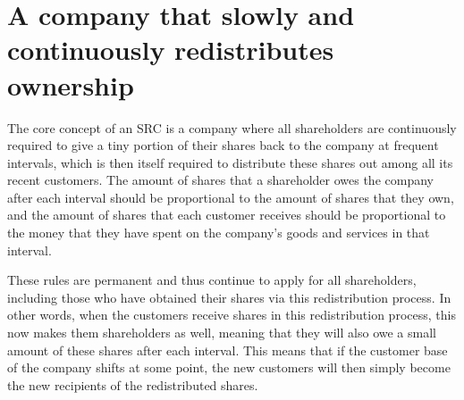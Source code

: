 \documentclass{article}
\begin{document}
\section{A company that slowly and continuously redistributes ownership}
\label{sect_def}



The core concept of an SRC is a company where all shareholders are continuously required to give a tiny portion of their shares back to the company at frequent intervals, which is then itself required to distribute these shares out among all its recent customers. The amount of shares that a shareholder owes the company after each interval should be proportional to the amount of shares that they own, and the amount of shares that each customer receives should be proportional to the money that they have spent on the company's goods and services in that interval. 

These rules are permanent and thus continue to apply for all shareholders, including those who have obtained their shares via this redistribution process. In other words, when the customers receive shares in this redistribution process, this now makes them shareholders as well, meaning that they will also owe a small amount of these shares after each interval. 
This means that if the customer base of the company shifts at some point, the new customers will then simply become the new recipients of the redistributed shares.
\end{document}

